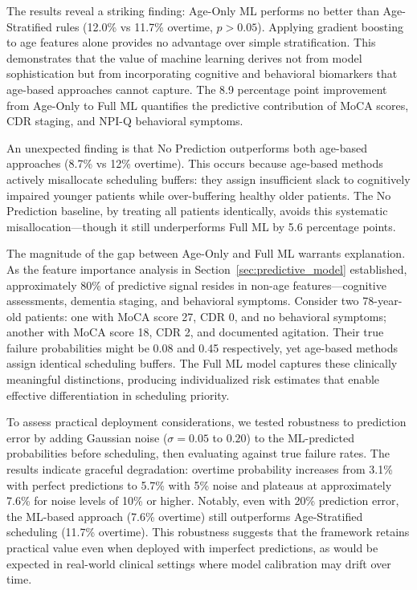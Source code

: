 \documentclass[11pt,a4paper]{article}
\begin{document}
The results reveal a striking finding: Age-Only ML performs no better than Age-Stratified rules (12.0\% vs 11.7\% overtime, $p > 0.05$). Applying gradient boosting to age features alone provides no advantage over simple stratification. This demonstrates that the value of machine learning derives not from model sophistication but from incorporating cognitive and behavioral biomarkers that age-based approaches cannot capture. The 8.9 percentage point improvement from Age-Only to Full ML quantifies the predictive contribution of MoCA scores, CDR staging, and NPI-Q behavioral symptoms.

An unexpected finding is that No Prediction outperforms both age-based approaches (8.7\% vs 12\% overtime). This occurs because age-based methods actively misallocate scheduling buffers: they assign insufficient slack to cognitively impaired younger patients while over-buffering healthy older patients. The No Prediction baseline, by treating all patients identically, avoids this systematic misallocation---though it still underperforms Full ML by 5.6 percentage points.

The magnitude of the gap between Age-Only and Full ML warrants explanation. As the feature importance analysis in Section~\ref{sec:predictive_model} established, approximately 80\% of predictive signal resides in non-age features---cognitive assessments, dementia staging, and behavioral symptoms. Consider two 78-year-old patients: one with MoCA score 27, CDR 0, and no behavioral symptoms; another with MoCA score 18, CDR 2, and documented agitation. Their true failure probabilities might be 0.08 and 0.45 respectively, yet age-based methods assign identical scheduling buffers. The Full ML model captures these clinically meaningful distinctions, producing individualized risk estimates that enable effective differentiation in scheduling priority.

To assess practical deployment considerations, we tested robustness to prediction error by adding Gaussian noise ($\sigma = 0.05$ to $0.20$) to the ML-predicted probabilities before scheduling, then evaluating against true failure rates. The results indicate graceful degradation: overtime probability increases from 3.1\% with perfect predictions to 5.7\% with 5\% noise and plateaus at approximately 7.6\% for noise levels of 10\% or higher. Notably, even with 20\% prediction error, the ML-based approach (7.6\% overtime) still outperforms Age-Stratified scheduling (11.7\% overtime). This robustness suggests that the framework retains practical value even when deployed with imperfect predictions, as would be expected in real-world clinical settings where model calibration may drift over time.
\end{document}
